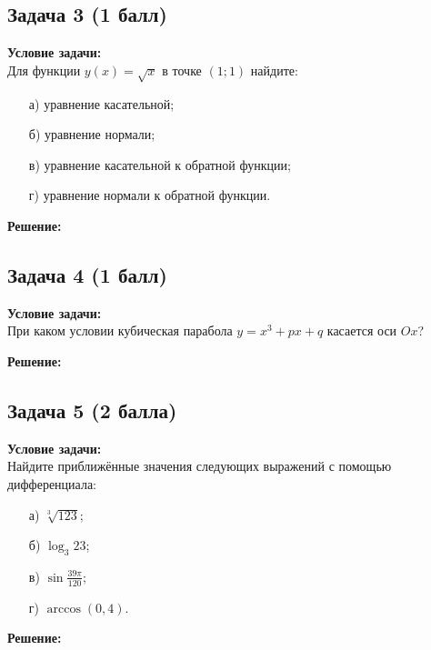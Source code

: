 \documentclass[a4paper,12pt]{article}
\begin{document}
\subsection{Задача 3 (1 балл)}
\textbf{Условие задачи:} \\
Для функции \( y(x) = \sqrt{x} \) в точке \( (1; 1) \) найдите:
\begin{itemize}
    \item[а)] уравнение касательной;
    \item[б)] уравнение нормали;
    \item[в)] уравнение касательной к обратной функции;
    \item[г)] уравнение нормали к обратной функции.
\end{itemize}

\textbf{Решение:} \\

\vspace{1cm}

\subsection{Задача 4 (1 балл)}
\textbf{Условие задачи:} \\
При каком условии кубическая парабола \( y = x^3 + px + q \) касается оси \( Ox \)?

\textbf{Решение:} \\

\vspace{1cm}

\subsection{Задача 5 (2 балла)}
\textbf{Условие задачи:} \\
Найдите приближённые значения следующих выражений с помощью дифференциала:
\begin{itemize}
    \item[а)] \( \sqrt[3]{123} \);
    \item[б)] \( \log_3 23 \);
    \item[в)] \( \sin \frac{39\pi}{120} \);
    \item[г)] \( \arccos(0{,}4) \).
\end{itemize}

\textbf{Решение:} \\

\vspace{1cm}
\end{document}
